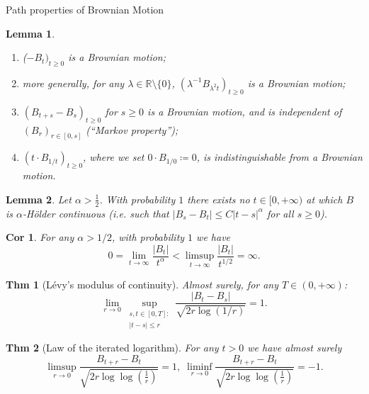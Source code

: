 \documentclass[a4paper]{article}
\theoremstyle{mytheoremstyle}
\newtheorem{theorem}{Thm}
\newtheorem{lemma}{Lemma}
\newtheorem{corollary}{Cor}[theorem]
\newcommand{\1}{\mathds{1}}
\begin{document}
\begin{multicols*}{3}
\begin{roundbox}{Path properties of Brownian Motion}
\begin{lemma}
    \begin{enumerate}
      \item ($- B_t)_{t \geqslant 0}$ is a Brownian motion;

      \item more generally, for any $\lambda \in \mathbb{R} \setminus \{0\}$,
        $(\lambda^{- 1} B_{\lambda^2 t})_{t \geqslant 0}$ is a Brownian motion;

      \item $(B_{t + s} - B_s)_{t \geqslant 0}$ for $s \geqslant 0$ is a
        Brownian motion, and is independent of $(B_r)_{r \in [0, s]}$
        ({\emph{``Markov property''}});

      \item $(t \cdot B_{1 / t})_{t \geqslant 0}$, where we set $0 \cdot B_{1 /
        0} \coloneq 0$, is indistinguishable from a Brownian motion.
    \end{enumerate}
  \end{lemma}

  \begin{lemma}
    Let $\alpha > \frac{1}{2}$. With probability $1$ there exists no $t \in [0,
    + \infty)$ at which $B$ is $\alpha$-H{\"o}lder continuous (i.e. such that $|
    B_s - B_t | \leqslant C | t - s |^{\alpha}$ for all $s \geqslant 0$).
  \end{lemma}

  \begin{corollary}
    \label{cor:bm-growth}For any $\alpha > 1 / 2$, with probability $1$ we have
    \vspace{-0.25em}
    \[ 0 = \lim_{t \rightarrow \infty}  \frac{|B_t |}{t^{\alpha}} < \limsup_{t
    \rightarrow \infty}  \frac{|B_t |}{t^{1 / 2}} = \infty . \]
  \end{corollary}
\end{roundbox}

\begin{unlabeledbox}
  \begin{theorem}[L{\'e}vy's modulus of continuity] \label{thm:law.iterated.log}
    Almost surely, for any $T \in (0, + \infty)$:
    \vspace{-1em}
    \[
      \lim_{r \rightarrow 0} \sup_{\substack{
          s, t \in [0, T] :\\
          | t - s | \leqslant r
      }}
      \frac{| B_t - B_s |}{\sqrt{2 r \log (1 / r)}} = 1.
    \]
  \end{theorem}

  \begin{theorem}[Law of the iterated logarithm]
    For any $t > 0$ we have almost surely
    \[
      \limsup_{r \rightarrow 0} \frac{B_{t + r} - B_t}{\sqrt{2 r \log
      \log (\frac{1}{r})}} = 1, \;
      \liminf_{r \rightarrow 0} \frac{B_{t + r} - B_t}{\sqrt{2 r \log
      \log (\frac{1}{r})}} = - 1.
    \]
  \end{theorem}
\end{unlabeledbox}


\end{multicols*}
\end{document}
